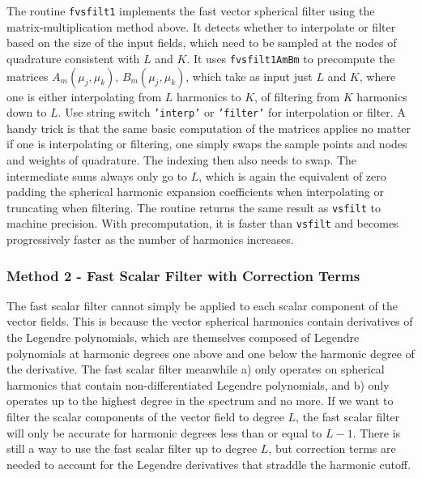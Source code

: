 The routine \texttt{fvsfilt1} implements the fast vector spherical filter using the matrix-multiplication method above. It detects whether to interpolate or filter based on the size of the input fields, which need to be sampled at the nodes of quadrature consistent with $L$ and $K$.  It uses \texttt{fvsfilt1AmBm} to precompute the matrices $A_m(\mu_j,\mu_k) $, $B_m(\mu_j,\mu_k)$, which take as input just $L$ and $K$, where one is either interpolating from $L$ harmonics to $K$, of filtering from $K$ harmonics down to $L$. Use string switch \texttt{'interp'} or \texttt{'filter'} for interpolation or filter. A handy trick is that the same basic computation of the matrices applies no matter if one is interpolating or filtering, one simply swaps the sample points and nodes and weights of quadrature. The indexing then also needs to swap. The intermediate sums always only go to $L$, which is again the equivalent of zero padding the spherical harmonic expansion coefficients when interpolating or truncating when filtering. The routine returns the same result as \texttt{vsfilt} to machine precision. With precomputation, it is faster than \texttt{vsfilt} and becomes progressively faster as the number of harmonics increases.

{\footnotesize
{}
}

{\footnotesize
{}
}



\subsubsection{Method 2 - Fast Scalar Filter with Correction Terms}


The fast scalar filter cannot simply be applied to each scalar component of the vector fields. This is because the vector spherical harmonics contain derivatives of the Legendre polynomials, which are themselves composed of Legendre polynomials at harmonic degrees one above and one below the harmonic degree of the derivative. The fast scalar filter meanwhile a) only operates on spherical harmonics that contain non-differentiated Legendre polynomials, and b) only operates up to the highest degree in the spectrum and no more. If we want to filter the scalar components of the vector field to degree $L$, the fast scalar filter will only be accurate for harmonic degrees less than or equal to $L-1$. There is still a way to use the fast scalar filter up to degree $L$, but correction terms are needed to account for the Legendre derivatives that straddle the harmonic cutoff.

